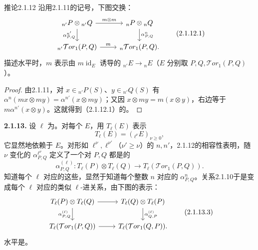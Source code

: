 \begin{SGAresult}{推论}{2.1.12}
沿用2.1.11的记号，下图交换：
\[\begin{tikzcd}
{}_{n'}P\otimes{}_{n'}Q\arrow[r,"m\otimes m"]\arrow[d,"{\alpha^{n'}_{P,Q}}"']&{}_nP\otimes{}_nQ\arrow[d,"{\alpha^n_{P,Q}}"]\\
{}_{n'}\mathcal Tor_1(P,Q)\arrow[r,"m"]&{}_n\mathcal Tor_1(P,Q).
\end{tikzcd}\tag{2.1.12.1}\]
描述水平时，$m$ 表示由 $m\operatorname{id}_E$ 诱导的 ${}_{n'}E\longrightarrow{}_nE$（$E$ 分别取 $P,Q,\mathcal Tor_1(P,Q)$）。
\end{SGAresult}
\begin{proof}
由2.1.11，对 $x\in{}_{n'}P(S)$、$y\in{}_{n'}Q(S)$ 有
$\alpha^n(mx\otimes my)=\alpha^{n'}(x\otimes my)$；又因 $x\otimes my=m(x\otimes y)$，右边等于 $m\alpha^{n'}(x\otimes y)$。这就得到（2.1.12.1）的。
\end{proof}
\textbf{2.1.13.} 设 $\ell$ 为。对每个 $E$，用 $T_\ell(E)$ 表示
\[T_\ell(E)=({}_{\ell^\nu}E)_{\nu\geq0},\tag{2.1.13.1}\]
它显然地依赖于 $E$。对形如 $\ell^\nu,\ell^{\nu'}$（$\nu'\geq\nu$）的 $n,n'$，2.1.12的相容性表明，随 $\nu$ 变化的 $\alpha^{\ell^\nu}_{P,Q}$ 定义了一个对 $P,Q$ 都是的
\[\alpha^{(\ell)}_{P,Q}:T_\ell(P)\otimes T_\ell(Q)\longrightarrow T_\ell(\mathcal Tor_1(P,Q)).\tag{2.1.13.2}\]
知道每个 $\ell$ 对应的这些，显然于知道每个整数 $n$ 对应的 $\alpha^n_{P,Q}$。关系2.1.10于是变成每个 $\ell$ 对应的类似 $\ell$-进关系，由下图的表示：
\[\begin{tikzcd}
T_\ell(P)\otimes T_\ell(Q)\arrow[r]\arrow[d,"{\alpha^{(\ell)}_{P,Q}}"']&T_\ell(Q)\otimes T_\ell(P)\arrow[d,"{\alpha^{(\ell)}_{Q,P}}"]\\
T_\ell(\mathcal Tor_1(P,Q))\arrow[r]&T_\ell(\mathcal Tor_1(Q,P)).
\end{tikzcd}\tag{2.1.13.3}\]
水平是。

